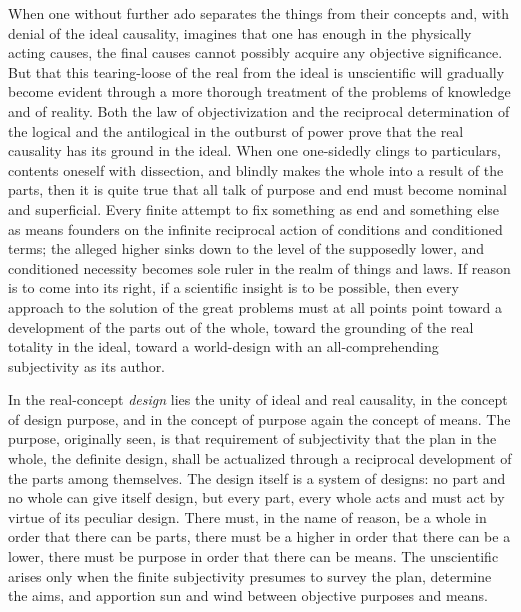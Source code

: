 \documentclass[12pt]{article}
\begin{document}
When one without further ado separates the things from their concepts and,
with denial of the ideal causality, imagines that one
has enough in the physically acting causes, the final causes cannot possibly
acquire any objective significance. But that this tearing-loose of the real
from the ideal is unscientific will gradually become evident through a more
thorough treatment of the problems of knowledge and of reality. Both the law
of objectivization and the reciprocal determination of the logical and the
antilogical in the outburst of power prove that the real causality has its
ground in the ideal. When one one-sidedly clings to particulars, contents
oneself with dissection, and blindly makes the whole into a result of the
parts, then it is quite true that all talk of purpose and end must become
nominal and superficial. Every finite attempt to fix something as end and
something else as means founders on the infinite reciprocal action of
conditions and conditioned terms; the alleged higher sinks down to the level
of the supposedly lower, and conditioned necessity becomes sole ruler in the
realm of things and laws. If reason is to come into its right, if a
scientific insight is to be possible, then every approach to the solution of
the great problems must at all points point toward a development of the
parts out of the whole, toward the grounding of the real totality in the
ideal, toward a world-design with an all-comprehending subjectivity as its
author.

In the real-concept \emph{design} lies the unity of ideal and real
causality, in the concept of design purpose, and in the concept of purpose
again the concept of means. The purpose, originally seen, is that
requirement of subjectivity that the plan in the whole, the definite design,
shall be actualized through a reciprocal development of the parts among
themselves. The design itself is a system of designs: no part and no whole
can give itself design, but every part, every whole acts and must act by
virtue of its peculiar design. There must, in the name of reason, be a whole
in order that there can be parts, there must be a higher in order that there
can be a lower, there must be purpose in order that there can be means. The
unscientific arises only when the finite subjectivity presumes to survey the
plan, determine the aims, and apportion sun and wind between objective
purposes and means.
\end{document}
